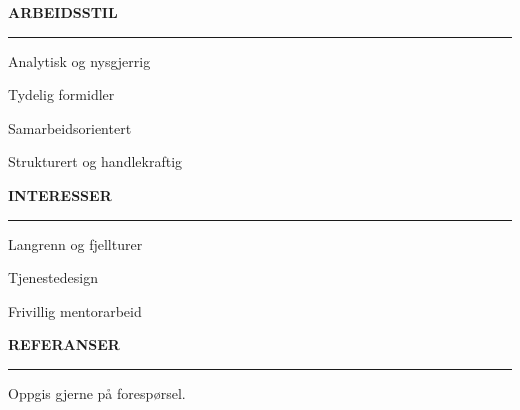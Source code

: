 \documentclass[10pt,a4paper]{article}
\newcommand{\sideheading}[2]{%
  \vspace{5pt}%
  {\normalsize\bfseries\color{navy}#1\hspace{4pt}\MakeUppercase{#2}}\par
  \vspace{1pt}%
  {\color{fjord}\rule{\linewidth}{0.7pt}}\par
  \vspace{3pt}%
}
\begin{document}
\begin{minipage}[t]{0.305\textwidth}
\begin{tcolorbox}[
    colback=ice,
    colframe=rulegray,
    boxrule=0.6pt,
    arc=3pt,
    left=8pt,right=8pt,top=5pt,bottom=7pt,
    width=\linewidth
  ]
    \sideheading{\faLightbulb}{Arbeidsstil}
    \small
    Analytisk og nysgjerrig\par
    Tydelig formidler\par
    Samarbeidsorientert\par
    Strukturert og handlekraftig\par

    \sideheading{\faHeart}{Interesser}
    \small
    Langrenn og fjellturer\par
    Tjenestedesign\par
    Frivillig mentorarbeid\par

    \sideheading{\faInfoCircle}{Referanser}
    \small
    Oppgis gjerne på forespørsel.
  \end{tcolorbox}
\end{minipage}
\end{document}
